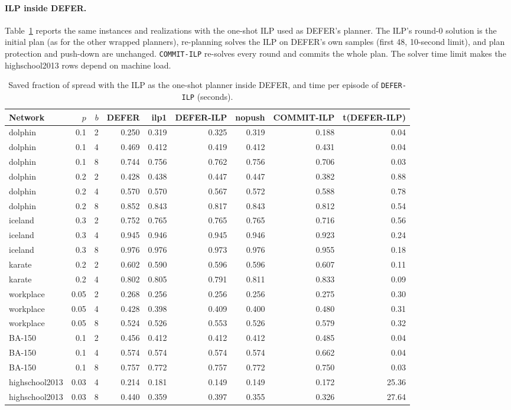 \documentclass[ASNA,number]{USG}
\begin{document}
\paragraph{ILP inside DEFER.} Table~\ref{tab:defer-ilp} reports the same
instances and realizations with the one-shot ILP used as DEFER's planner. The
ILP's round-0 solution is the initial plan (as for the other wrapped planners),
re-planning solves the ILP on DEFER's own samples (first 48, 10-second limit),
and plan protection and push-down are unchanged. \texttt{COMMIT-ILP} re-solves
every round and commits the whole plan. The solver time limit makes the
highschool2013 rows depend on machine load.

\begin{table}[h]
\centering
\caption{Saved fraction of spread with the ILP as the one-shot planner inside DEFER,
and time per episode of \texttt{DEFER-ILP} (seconds).\label{tab:defer-ilp}}
\footnotesize
\begin{tabular}{lrrrrrrrr}
\hline
Network & $p$ & $b$ & DEFER & ilp1 & DEFER-ILP & nopush & COMMIT-ILP & t(DEFER-ILP)\\
\hline
dolphin & 0.1 & 2 & 0.250 & 0.319 & 0.325 & 0.319 & 0.188 & 0.04 \\
dolphin & 0.1 & 4 & 0.469 & 0.412 & 0.419 & 0.412 & 0.431 & 0.04 \\
dolphin & 0.1 & 8 & 0.744 & 0.756 & 0.762 & 0.756 & 0.706 & 0.03 \\
dolphin & 0.2 & 2 & 0.428 & 0.438 & 0.447 & 0.447 & 0.382 & 0.88 \\
dolphin & 0.2 & 4 & 0.570 & 0.570 & 0.567 & 0.572 & 0.588 & 0.78 \\
dolphin & 0.2 & 8 & 0.852 & 0.843 & 0.817 & 0.843 & 0.812 & 0.54 \\
iceland & 0.3 & 2 & 0.752 & 0.765 & 0.765 & 0.765 & 0.716 & 0.56 \\
iceland & 0.3 & 4 & 0.945 & 0.946 & 0.945 & 0.946 & 0.923 & 0.24 \\
iceland & 0.3 & 8 & 0.976 & 0.976 & 0.973 & 0.976 & 0.955 & 0.18 \\
karate & 0.2 & 2 & 0.602 & 0.590 & 0.596 & 0.596 & 0.607 & 0.11 \\
karate & 0.2 & 4 & 0.802 & 0.805 & 0.791 & 0.811 & 0.833 & 0.09 \\
workplace & 0.05 & 2 & 0.268 & 0.256 & 0.256 & 0.256 & 0.275 & 0.30 \\
workplace & 0.05 & 4 & 0.428 & 0.398 & 0.409 & 0.400 & 0.480 & 0.31 \\
workplace & 0.05 & 8 & 0.524 & 0.526 & 0.553 & 0.526 & 0.579 & 0.32 \\
BA-150 & 0.1 & 2 & 0.456 & 0.412 & 0.412 & 0.412 & 0.485 & 0.04 \\
BA-150 & 0.1 & 4 & 0.574 & 0.574 & 0.574 & 0.574 & 0.662 & 0.04 \\
BA-150 & 0.1 & 8 & 0.757 & 0.772 & 0.757 & 0.772 & 0.750 & 0.03 \\
highschool2013 & 0.03 & 4 & 0.214 & 0.181 & 0.149 & 0.149 & 0.172 & 25.36 \\
highschool2013 & 0.03 & 8 & 0.440 & 0.359 & 0.397 & 0.355 & 0.326 & 27.64 \\
\hline
\end{tabular}
\end{table}
\end{document}
